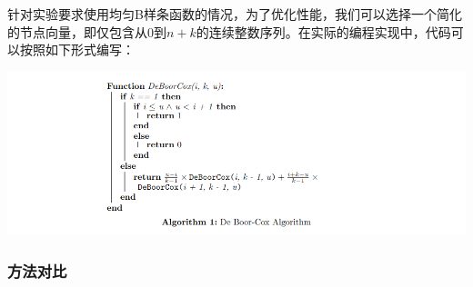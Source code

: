 \documentclass[a4paper,UTF8]{article}
\theoremstyle{definition}
\begin{document}
针对实验要求使用均匀B样条函数的情况，为了优化性能，我们可以选择一个简化的节点向量，即仅包含从$0$到$n+k$的连续整数序列。在实际的编程实现中，代码可以按照如下形式编写：

\begin{center}
	\includegraphics[width=6in]{figs/algorithm1.png}
\end{center}

\subsubsection{方法对比}
\end{document}
